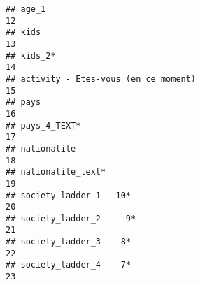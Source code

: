 \documentclass[
]{article}
\begin{document}
\begin{verbatim}
## age_1                                                                                                                                                                                                                        12
## kids                                                                                                                                                                                                                         13
## kids_2*                                                                                                                                                                                                                      14
## activity - Etes-vous (en ce moment)                                                                                                                                                                                          15
## pays                                                                                                                                                                                                                         16
## pays_4_TEXT*                                                                                                                                                                                                                 17
## nationalite                                                                                                                                                                                                                  18
## nationalite_text*                                                                                                                                                                                                            19
## society_ladder_1 - 10*                                                                                                                                                                                                       20
## society_ladder_2 - - 9*                                                                                                                                                                                                      21
## society_ladder_3 -- 8*                                                                                                                                                                                                       22
## society_ladder_4 -- 7*                                                                                                                                                                                                       23

\end{verbatim}
\end{document}
